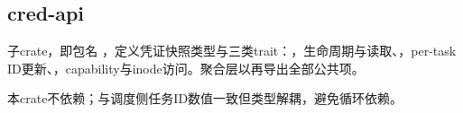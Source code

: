 
\subsection{cred-api}

子crate，即包名 ，定义凭证快照类型与三类trait：，生命周期与读取、，per-task ID更新、，capability与inode访问。聚合层以再导出全部公共项。

本crate不依赖；与调度侧任务ID数值一致但类型解耦，避免循环依赖。


